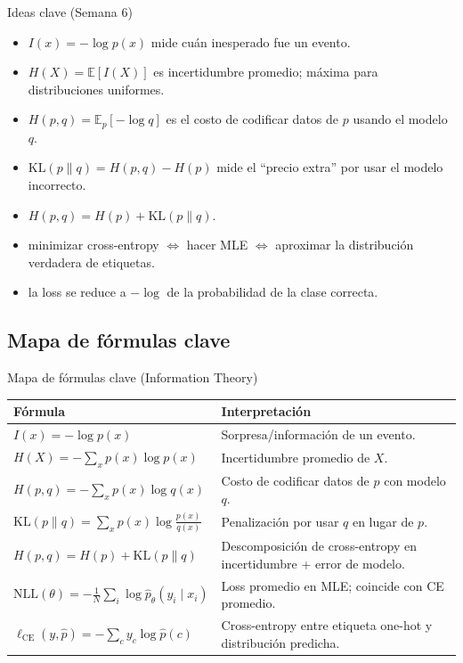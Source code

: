 \begin{frame}{Ideas clave (Semana 6)}
\begin{itemize}
  \item {} \(I(x)=-\log p(x)\) mide cuán inesperado fue un evento.
  \item {} \(H(X)=\mathbb{E}[I(X)]\) es incertidumbre promedio; máxima para distribuciones uniformes.
  \item {} \(H(p,q)=\mathbb{E}_{p}[-\log q]\) es el costo de codificar datos de \(p\) usando el modelo \(q\).
  \item {} \(\mathrm{KL}(p\|q)=H(p,q)-H(p)\) mide el “precio extra” por usar el modelo incorrecto.
  \item {} \(H(p,q)=H(p)+\mathrm{KL}(p\|q)\).
  \item {} minimizar cross-entropy \(\Leftrightarrow\) hacer MLE \(\Leftrightarrow\) aproximar la distribución verdadera de etiquetas.
  \item {} la loss se reduce a \(-\log\) de la probabilidad de la clase correcta.
\end{itemize}
\end{frame}

\subsection[Fórmulas]{Mapa de fórmulas clave}

\begin{frame}{Mapa de fórmulas clave (Information Theory)}
\small
\begin{tabular}{ll}
\toprule
\textbf{Fórmula} & \textbf{Interpretación} \\
\midrule
\(I(x)=-\log p(x)\) &
  Sorpresa/información de un evento. \\
\(H(X)=-\sum_x p(x)\log p(x)\) &
  Incertidumbre promedio de \(X\). \\
\(H(p,q)=-\sum_x p(x)\log q(x)\) &
  Costo de codificar datos de \(p\) con modelo \(q\). \\
\(\mathrm{KL}(p\|q)=\sum_x p(x)\log\frac{p(x)}{q(x)}\) &
  Penalización por usar \(q\) en lugar de \(p\). \\
\(H(p,q)=H(p)+\mathrm{KL}(p\|q)\) &
  Descomposición de cross-entropy en incertidumbre + error de modelo. \\
\(\mathrm{NLL}(\theta)=-\frac{1}{N}\sum_i\log \hat p_\theta(y_i\mid x_i)\) &
  Loss promedio en MLE; coincide con CE promedio. \\
\(\ell_{\mathrm{CE}}(y,\hat p)=-\sum_c y_c\log \hat p(c)\) &
  Cross-entropy entre etiqueta one-hot y distribución predicha. \\
\bottomrule
\end{tabular}
\end{frame}

